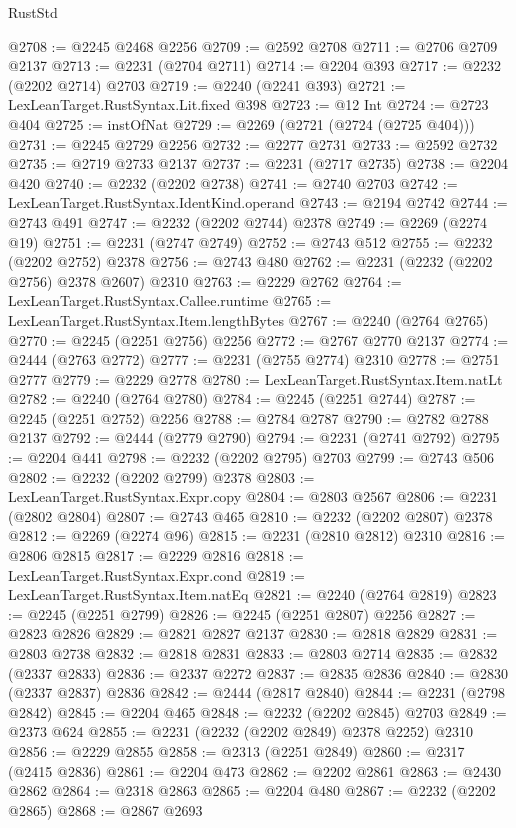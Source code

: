 \begin{lexlean}{RustStd}
\begin{coremodule}
@2708 := @2245 @2468 @2256
@2709 := @2592 @2708
@2711 := @2706 @2709 @2137
@2713 := @2231 (@2704 @2711)
@2714 := @2204 @393
@2717 := @2232 (@2202 @2714) @2703
@2719 := @2240 (@2241 @393)
@2721 := LexLeanTarget.RustSyntax.Lit.fixed @398
@2723 := @12 Int
@2724 := @2723 @404
@2725 := instOfNat
@2729 := @2269 (@2721 (@2724 (@2725 @404)))
@2731 := @2245 @2729 @2256
@2732 := @2277 @2731
@2733 := @2592 @2732
@2735 := @2719 @2733 @2137
@2737 := @2231 (@2717 @2735)
@2738 := @2204 @420
@2740 := @2232 (@2202 @2738)
@2741 := @2740 @2703
@2742 := LexLeanTarget.RustSyntax.IdentKind.operand
@2743 := @2194 @2742
@2744 := @2743 @491
@2747 := @2232 (@2202 @2744) @2378
@2749 := @2269 (@2274 @19)
@2751 := @2231 (@2747 @2749)
@2752 := @2743 @512
@2755 := @2232 (@2202 @2752) @2378
@2756 := @2743 @480
@2762 := @2231 (@2232 (@2202 @2756) @2378 @2607) @2310
@2763 := @2229 @2762
@2764 := LexLeanTarget.RustSyntax.Callee.runtime
@2765 := LexLeanTarget.RustSyntax.Item.lengthBytes
@2767 := @2240 (@2764 @2765)
@2770 := @2245 (@2251 @2756) @2256
@2772 := @2767 @2770 @2137
@2774 := @2444 (@2763 @2772)
@2777 := @2231 (@2755 @2774) @2310
@2778 := @2751 @2777
@2779 := @2229 @2778
@2780 := LexLeanTarget.RustSyntax.Item.natLt
@2782 := @2240 (@2764 @2780)
@2784 := @2245 (@2251 @2744)
@2787 := @2245 (@2251 @2752) @2256
@2788 := @2784 @2787
@2790 := @2782 @2788 @2137
@2792 := @2444 (@2779 @2790)
@2794 := @2231 (@2741 @2792)
@2795 := @2204 @441
@2798 := @2232 (@2202 @2795) @2703
@2799 := @2743 @506
@2802 := @2232 (@2202 @2799) @2378
@2803 := LexLeanTarget.RustSyntax.Expr.copy
@2804 := @2803 @2567
@2806 := @2231 (@2802 @2804)
@2807 := @2743 @465
@2810 := @2232 (@2202 @2807) @2378
@2812 := @2269 (@2274 @96)
@2815 := @2231 (@2810 @2812) @2310
@2816 := @2806 @2815
@2817 := @2229 @2816
@2818 := LexLeanTarget.RustSyntax.Expr.cond
@2819 := LexLeanTarget.RustSyntax.Item.natEq
@2821 := @2240 (@2764 @2819)
@2823 := @2245 (@2251 @2799)
@2826 := @2245 (@2251 @2807) @2256
@2827 := @2823 @2826
@2829 := @2821 @2827 @2137
@2830 := @2818 @2829
@2831 := @2803 @2738
@2832 := @2818 @2831
@2833 := @2803 @2714
@2835 := @2832 (@2337 @2833)
@2836 := @2337 @2272
@2837 := @2835 @2836
@2840 := @2830 (@2337 @2837) @2836
@2842 := @2444 (@2817 @2840)
@2844 := @2231 (@2798 @2842)
@2845 := @2204 @465
@2848 := @2232 (@2202 @2845) @2703
@2849 := @2373 @624
@2855 := @2231 (@2232 (@2202 @2849) @2378 @2252) @2310
@2856 := @2229 @2855
@2858 := @2313 (@2251 @2849)
@2860 := @2317 (@2415 @2836)
@2861 := @2204 @473
@2862 := @2202 @2861
@2863 := @2430 @2862
@2864 := @2318 @2863
@2865 := @2204 @480
@2867 := @2232 (@2202 @2865)
@2868 := @2867 @2693

\end{coremodule}
\end{lexlean}
